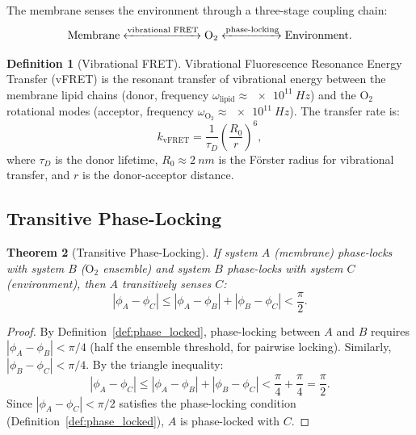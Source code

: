 \documentclass[12pt]{article}
\newtheorem{theorem}{Theorem}[section]
\theoremstyle{definition}
\newtheorem{definition}[theorem]{Definition}
\theoremstyle{remark}
\begin{document}
The membrane senses the environment through a three-stage coupling chain:
\begin{equation}
  \text{Membrane} \xleftrightarrow{\text{vibrational FRET}} \mathrm{O}_2 \xleftrightarrow{\text{phase-locking}} \text{Environment}.
  \label{eq:coupling_chain}
\end{equation}

\begin{definition}[Vibrational FRET]
\label{def:vfret}
Vibrational Fluorescence Resonance Energy Transfer (vFRET) is the resonant transfer of vibrational energy between the membrane lipid chains (donor, frequency $\omega_{\mathrm{lipid}} \approx \SI{e11}{Hz}$) and the $\mathrm{O}_2$ rotational modes (acceptor, frequency $\omega_{\mathrm{O}_2} \approx \SI{e11}{Hz}$). The transfer rate is:
\begin{equation}
  k_{\mathrm{vFRET}} = \frac{1}{\tau_D}\left(\frac{R_0}{r}\right)^6,
  \label{eq:vfret}
\end{equation}
where $\tau_D$ is the donor lifetime, $R_0 \approx \SI{2}{nm}$ is the F\"orster radius for vibrational transfer, and $r$ is the donor-acceptor distance.
\end{definition}

\subsection{Transitive Phase-Locking}

\begin{theorem}[Transitive Phase-Locking]
\label{thm:transitive}
If system $A$ (membrane) phase-locks with system $B$ ($\mathrm{O}_2$ ensemble) and system $B$ phase-locks with system $C$ (environment), then $A$ transitively senses $C$:
\begin{equation}
  |\phi_A - \phi_C| \leq |\phi_A - \phi_B| + |\phi_B - \phi_C| < \frac{\pi}{2}.
  \label{eq:transitive}
\end{equation}
\end{theorem}

\begin{proof}
By Definition~\ref{def:phase_locked}, phase-locking between $A$ and $B$ requires $|\phi_A - \phi_B| < \pi/4$ (half the ensemble threshold, for pairwise locking). Similarly, $|\phi_B - \phi_C| < \pi/4$. By the triangle inequality:
\begin{equation}
  |\phi_A - \phi_C| \leq |\phi_A - \phi_B| + |\phi_B - \phi_C| < \frac{\pi}{4} + \frac{\pi}{4} = \frac{\pi}{2}.
  \label{eq:transitive_proof}
\end{equation}
Since $|\phi_A - \phi_C| < \pi/2$ satisfies the phase-locking condition (Definition~\ref{def:phase_locked}), $A$ is phase-locked with $C$.
\end{proof}
\end{document}
